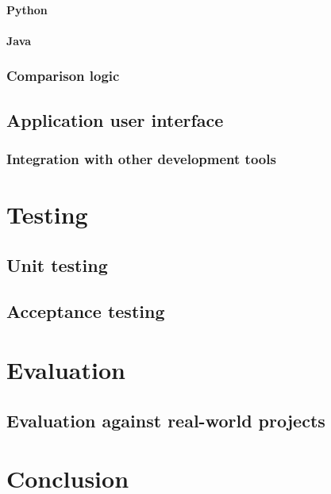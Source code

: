 \documentclass{l4proj}
\begin{document}
\subsubsection{Python}


\subsubsection{Java}

\subsection{Comparison logic}

\section{Application user interface}

\subsection{Integration with other development tools}

\chapter{Testing}

\section{Unit testing}

\section{Acceptance testing}

\chapter{Evaluation}


\section{Evaluation against real-world projects}


\chapter{Conclusion}
\end{document}
